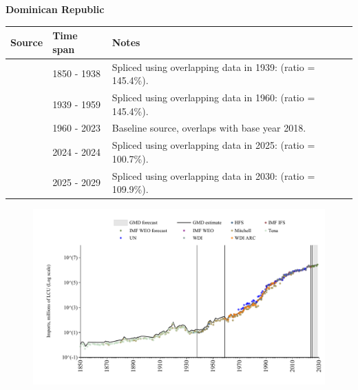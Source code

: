 \documentclass[12pt,a4paper,landscape]{article}
\begin{document}
\begin{adjustbox}{max totalsize={\paperwidth}{\paperheight},center}
\begin{minipage}[t][\textheight][t]{\textwidth}
\vspace*{0.5cm}
{}
\begin{center}
{\Large\bfseries Dominican Republic}
\end{center}
\vspace{0.5cm}
\begin{table}[H]
\centering
\small
\begin{tabular}{|l|l|l|}
\hline
\textbf{Source} & \textbf{Time span} & \textbf{Notes} \\
\hline
\rowcolor{white}\cite{Tena}& 1850 - 1938 &Spliced using overlapping data in 1939: (ratio = 145.4\%).\\
\rowcolor{lightgray}\cite{Mitchell}& 1939 - 1959 &Spliced using overlapping data in 1960: (ratio = 145.4\%).\\
\rowcolor{white}\cite{WDI}& 1960 - 2023 &Baseline source, overlaps with base year 2018.\\
\rowcolor{lightgray}\cite{IMF_IFS}& 2024 - 2024 &Spliced using overlapping data in 2025: (ratio = 100.7\%).\\
\rowcolor{white}\cite{IMF_WEO_forecast}& 2025 - 2029 &Spliced using overlapping data in 2030: (ratio = 109.9\%).\\
\hline
\end{tabular}
\end{table}
\begin{figure}[H]
\centering
\includegraphics[width=\textwidth,height=0.6\textheight,keepaspectratio]{graphs/DOM_imports.pdf}
\end{figure}
\end{minipage}
\end{adjustbox}
\end{document}
